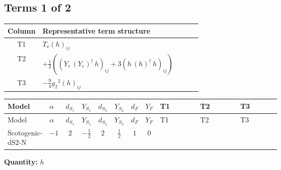 \documentclass[8pt]{article}
\begin{document}
\begin{landscape}
\subsection*{Terms 1 of 2}
\begin{center}
\begin{tabular}{@{}c >{\raggedright\arraybackslash}p{0.82\linewidth}@{}}
\toprule
Column & Representative term structure \\
\midrule
T1 & \(\displaystyle T_\nu \left({h}\right)_{ij}\) \\
\midrule
T2 & \(\displaystyle +\frac{1}{2} (\left({Y_e}\,\left({Y_e}\right)^{\dagger}\,{h}\right)_{ij}+3 \left({h}\,\left({h}\right)^{\dagger}\,{h}\right)_{ij})\) \\
\midrule
T3 & \(\displaystyle -\frac{9}{4} {g_2}^2 \left({h}\right)_{ij}\) \\
\midrule
\bottomrule
\end{tabular}
\end{center}
\smallskip
\tiny
\begin{longtable}{@{}llcccccc >{\raggedright\arraybackslash}p{0.21\linewidth} >{\raggedright\arraybackslash}p{0.21\linewidth} >{\raggedright\arraybackslash}p{0.21\linewidth}@{}}
\toprule
Model & $\alpha$ & $d_{S_1}$ & $Y_{S_1}$ & $d_{S_2}$ & $Y_{S_2}$ & $d_F$ & $Y_F$ & T1 & T2 & T3 \\
\midrule
\endfirsthead
\toprule
Model & $\alpha$ & $d_{S_1}$ & $Y_{S_1}$ & $d_{S_2}$ & $Y_{S_2}$ & $d_F$ & $Y_F$ & T1 & T2 & T3 \\
\midrule
\endhead
Scotogenic-dS2-N & $-1$ & $2$ & $-\frac{1}{2}$ & $2$ & $\frac{1}{2}$ & $1$ & $0$ & \scriptsize\adjustbox{max width=\linewidth}{$\begin{gathered} T_\nu \left({h}\right)_{ij}\end{gathered}$} & \scriptsize\adjustbox{max width=\linewidth}{$\begin{gathered} +\frac{1}{2} (\left({Y_e}\,\left({Y_e}\right)^{\dagger}\,{h}\right)_{ij}+3 \left({h}\,\left({h}\right)^{\dagger}\,{h}\right)_{ij})\end{gathered}$} & \scriptsize\adjustbox{max width=\linewidth}{$\begin{gathered} -\frac{9}{4} {g_2}^2 \left({h}\right)_{ij}\end{gathered}$} \\
\midrule
\bottomrule
\end{longtable}
\clearpage
\noindent\textbf{Quantity: }$h$\par\smallskip

\end{landscape}
\end{document}
